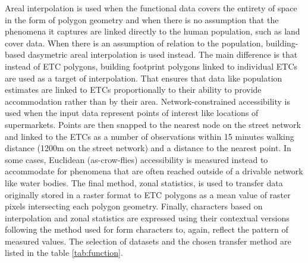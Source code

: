 Areal interpolation is used when the functional data covers the entirety of space in the
form of polygon geometry and when there is no assumption that the phenomena it captures
are linked directly to the human population, such as land cover data. When there is
an assumption of relation to the population, building-based dasymetric areal
interpolation is used instead. The main difference is that instead of ETC polygons,
building footprint polygons linked to individual ETCs are used as a target of
interpolation. That ensures that data like population estimates are linked to ETCs
proportionally to their ability to provide accommodation rather than by their area.
Network-constrained accessibility is used when the input data represent points of
interest like locations of supermarkets. Points are then snapped to the nearest node on
the street network and linked to the ETCs as a number of observations within 15 minutes
walking distance (1200m on the street network) and a distance to the nearest point. In
some cases, Euclidean (as-crow-flies) accessibility is measured instead to accommodate
for phenomena that are often reached outside of a drivable network like water bodies.
The final method, zonal statistics, is used to transfer data originally stored in a raster
format to ETC polygons as a mean value of raster pixels intersecting each polygon
geometry. Finally, characters based on interpolation and zonal statistics are expressed
using their contextual versions following the method used for form characters to, again,
reflect the pattern of measured values. The selection of datasets and the chosen
transfer method are listed in the table \ref{tab:function}.

